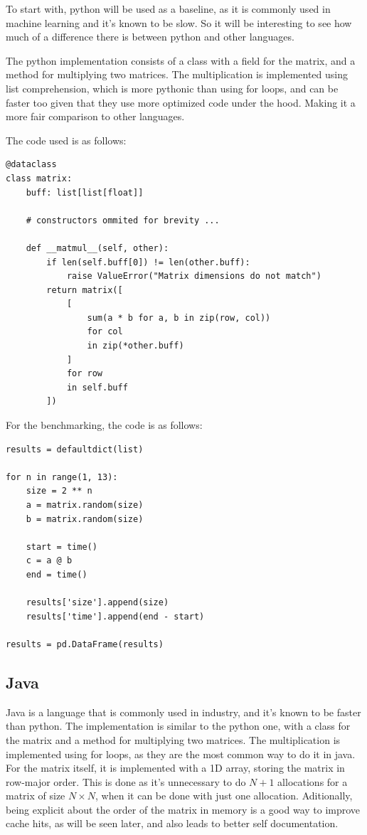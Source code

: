 \documentclass{article}
\begin{document}
To start with, python will be used as a baseline, as it is commonly used in machine learning and it's known to be slow.
So it will be interesting to see how much of a difference there is between python and other languages.

The python implementation consists of a class with a field for the matrix, and a method for multiplying two matrices.
The multiplication is implemented using list comprehension, which is more pythonic than using for loops, and can be faster too
given that they use more optimized code under the hood. Making it a more fair comparison to other languages.

The code used is as follows:

\begin{verbatim}
@dataclass
class matrix:
	buff: list[list[float]]

	# constructors ommited for brevity ...
	
	def __matmul__(self, other):
		if len(self.buff[0]) != len(other.buff):
			raise ValueError("Matrix dimensions do not match")
		return matrix([
			[
				sum(a * b for a, b in zip(row, col))
				for col
				in zip(*other.buff)
			]
			for row
			in self.buff
		])
\end{verbatim}

For the benchmarking, the code is as follows:

\begin{verbatim}
results = defaultdict(list)

for n in range(1, 13):
	size = 2 ** n
	a = matrix.random(size)
	b = matrix.random(size)

	start = time()
	c = a @ b
	end = time()

	results['size'].append(size)
	results['time'].append(end - start)

results = pd.DataFrame(results)
\end{verbatim}

\subsection{Java}

Java is a language that is commonly used in industry, and it's known to be faster than python.
The implementation is similar to the python one, with a class for the matrix and a method for multiplying two matrices.
The multiplication is implemented using for loops, as they are the most common way to do it in java.
For the matrix itself, it is implemented with a 1D array, storing the matrix in row-major order.
This is done as it's unnecessary to do $N+1$ allocations for a matrix of size $N\times N$,
when it can be done with just one allocation. Aditionally, being explicit about the order of the matrix in memory
is a good way to improve cache hits, as will be seen later, and also leads to better self documentation.
\end{document}
